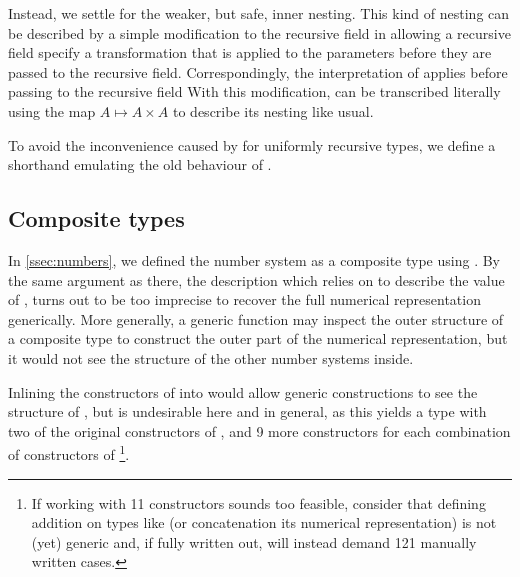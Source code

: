 Instead, we settle for the weaker, but safe, inner nesting. This kind of nesting can be described by a simple modification to the recursive field  in 
allowing a recursive field specify a transformation  that is applied to the parameters before they are passed to the recursive field. Correspondingly, the interpretation of  applies  before passing  to the recursive field 
With this modification,  can be transcribed literally
using the map $A \mapsto A \times A$ to describe its nesting like usual.

To avoid the inconvenience caused by  for uniformly recursive types, we define a shorthand
emulating the old behaviour of .


\subsection{Composite types}
In \autoref{ssec:numbers}, we defined the number system  as a composite type using . By the same argument as there, the description  which relies on  to describe the value of , turns out to be too imprecise to recover the full numerical representation generically. More generally, a generic function may inspect the outer structure of a composite type to construct the outer part of the numerical representation, but it would not see the structure of the other number systems inside.


Inlining the constructors of  into  would allow generic constructions to see the structure of , but is undesirable here and in general, as this yields a type with two of the original constructors of , and 9 more constructors for each combination of constructors of \footnote{If working with 11 constructors sounds too feasible, consider that defining addition on types like  (or concatenation its numerical representation) is not (yet) generic and, if fully written out, will instead demand 121 manually written cases.}. %

